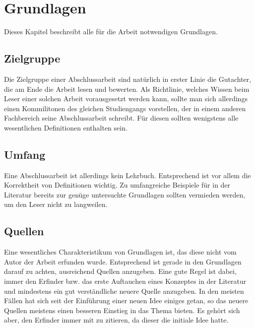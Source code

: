 \chapter{Grundlagen}
\label{chapter-basics}

Dieses Kapitel beschreibt alle für die Arbeit notwendigen Grundlagen.

\section{Zielgruppe}

Die Zielgruppe einer Abschlussarbeit sind natürlich in erster Linie die Gutachter, die am Ende die Arbeit lesen und bewerten. Als Richtlinie, welches Wissen beim Leser einer solchen Arbeit vorausgesetzt werden kann, sollte man sich allerdings einen Kommilitonen des gleichen Studiengangs vorstellen, der in einem anderen Fachbereich seine Abschlussarbeit schreibt. Für diesen sollten wenigstens alle wesentlichen Definitionen enthalten sein.

\section{Umfang}

Eine Abschlussarbeit ist allerdings kein Lehrbuch. Entsprechend ist vor allem die Korrektheit von Definitionen wichtig. Zu umfangreiche Beispiele für in der Literatur bereits zur genüge untersuchte Grundlagen sollten vermieden werden, um den Leser nicht zu langweilen.

\section{Quellen}

Eine wesentliches Charakteristikum von Grundlagen ist, das diese nicht vom Autor der Arbeit erfunden wurde. Entsprechend ist gerade in den Grundlagen darauf zu achten, ausreichend Quellen anzugeben. Eine gute Regel ist dabei, immer den Erfinder bzw. das erste Auftauchen eines Konzeptes in der Literatur und mindestens ein gut verständliche neuere Quelle anzugeben. In den meisten Fällen hat sich seit der Einführung einer neuen Idee einiges getan, so das neuere Quellen meistens einen besseren Einstieg in das Thema bieten. Es gehört sich aber, den Erfinder immer mit zu zitieren, da dieser die initiale Idee hatte.

